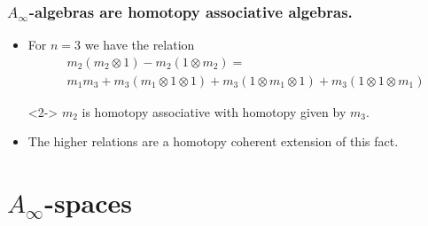 \documentclass{beamer}
\theoremstyle{definition}
\begin{document}
\begin{frame}
\frametitle{$A_\infty$-algebras are homotopy associative algebras.}
\begin{itemize}
\item<1-> For $n=3$ we have the relation
\begin{align*}
&m_2(m_2\otimes 1)-m_2(1\otimes m_2)=\\ %
&m_1m_3+m_3(m_1\otimes 1\otimes 1)+m_3(1\otimes m_1\otimes 1)+m_3(1\otimes 1\otimes m_1)
\end{align*}
\item[]<2-> $m_2$ is homotopy associative with homotopy given by $m_3$. %
\item<3-> The higher relations are a homotopy coherent extension of this fact. %
\end{itemize}
\end{frame}

\section{$A_\infty$-spaces}
\end{document}
